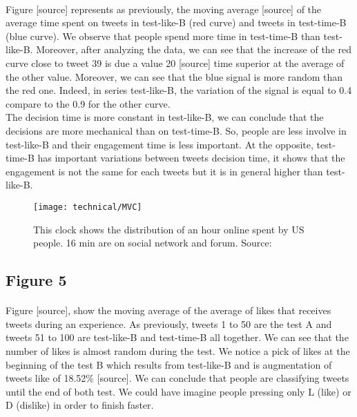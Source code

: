 \paragraph{}
Figure [source] represents as previously, the moving average [source] of the average time spent on tweets in test-like-B (red curve) and tweets in test-time-B (blue curve). We observe that people spend more time in test-time-B than test-like-B. Moreover, after analyzing the data, we can see that the increase of the red curve close to tweet 39 is due a value 20 [source] time superior at the average of the other value.
Moreover, we can see that the blue signal is more random than the red one. Indeed, in series test-like-B, the variation of the signal is equal to 0.4 compare to the 0.9 for the other curve.\\
The decision time is more constant in test-like-B, we can conclude that the decisions are more mechanical than on test-time-B. So,  people are less involve in test-like-B and their engagement time is less important. At the opposite, test-time-B has important variations between tweets decision time, it shows that the engagement is not the same for each tweets but it is in general higher than test-like-B.

\begin{figure}[h] 
\centering 
\texttt{[image: technical/MVC]} 
\caption[Time spent of Social Media]{This clock shows the distribution of an hour online spent by US people. 16 min are on social network and forum. Source: \cite{s_clock}}
\label{fig:tinder} 
\end{figure}


\subsection{Figure 5}

\paragraph{}
Figure [source], show the moving average of the average of likes that receives tweets during an experience. As previously, tweets 1 to 50 are the test A and tweets 51 to 100 are test-like-B and test-time-B all together.
We can see that the number of likes is almost random during the test. We notice a pick of likes at the beginning of the test B which results from test-like-B and is augmentation of tweets like of 18.52\% [source].
We can conclude that people are classifying tweets until the end of both test. We could have imagine people pressing only L (like) or D (dislike) in order to finish faster.

